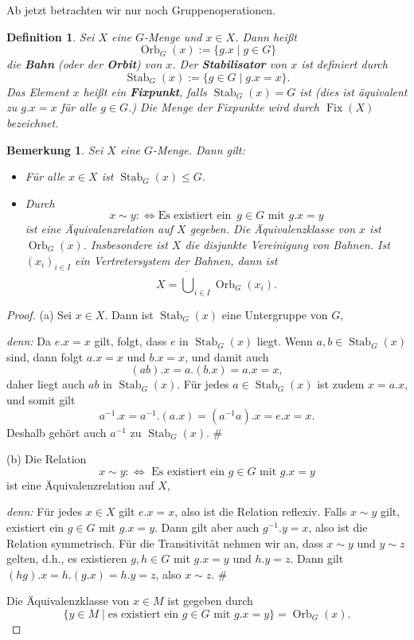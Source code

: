 \documentclass[a4paper, twoside, 11pt, ngerman]{report}
\DeclareMathOperator{\Fix}{Fix}
\DeclareMathOperator{\Orb}{Orb}
\DeclareMathOperator{\Stab}{Stab}
\theoremstyle{definistyle}
\newtheorem{defini}[satz]{Definition}
\newtheorem{bem}[satz]{Bemerkung}
\theoremstyle{remark}
\newenvironment{denn}%
  {\par\textit{denn:}}%
  {\hfill\#\par}
\newcommand{\defn}[1]{\textit{\bfseries #1}}
\begin{document}
Ab jetzt betrachten wir nur noch Gruppenoperationen.

\begin{defini}\label{def:orbit_stabilisator}
Sei $X$ eine $G$-Menge und $x \in X$. Dann heißt
\[
\Orb_G(x) := \{g . x \mid g \in G\}
\]
die \defn{Bahn} (oder der \defn{Orbit}) von $x$. Der \defn{Stabilisator} von $x$ ist definiert durch
\[
\Stab_G(x) := \{g \in G \mid g . x = x\}.
\]
Das Element $x$ heißt ein \defn{Fixpunkt}, falls $\Stab_G(x) = G$ ist (dies ist äquivalent zu  $g . x = x$ für alle $g \in G$.) Die Menge der Fixpunkte wird durch $\Fix(X)$ bezeichnet.
\end{defini}

\begin{bem}\label{bem:orbits_und_stabis}
Sei $X$ eine $G$-Menge. Dann gilt:
\begin{itemize}
    \item[(a)] Für alle $x \in X$ ist $\Stab_G(x) \leq G$.
    \item[(b)] Durch \[x \sim y :\Leftrightarrow \text{Es existiert ein } \, g \in G \text{ mit } g . x = y\] ist eine Äquivalenzrelation auf $X$ gegeben. Die Äquivalenzklasse von $x$ ist $\Orb_G(x)$. Insbesondere ist $X$ die disjunkte Vereinigung von Bahnen. Ist $(x_i )_{i\in I}$ ein Vertretersystem der Bahnen, dann ist 
    \[
     X = \dot\bigcup_{i\in I}\Orb_G(x_i).
    \]
\end{itemize}
\end{bem}


\begin{proof}
(a) Sei $x \in X$. Dann ist $\Stab_G(x)$ eine Untergruppe von $G$,
\begin{denn}
Da $e . x = x$ gilt, folgt, dass $e$ in $\Stab_G(x)$ liegt. Wenn $a, b \in \Stab_G(x)$ sind, dann folgt $a . x = x$ und $b . x = x$, und damit auch \[
(a b) . x = a . (b . x) = a . x = x,\] daher liegt auch $a b$ in $\Stab_G(x)$. Für jedes $a \in \Stab_G(x)$ ist zudem $x = a . x$, und somit gilt \[a^{-1} . x = a^{-1} . (a . x) = (a^{-1} a) . x = e . x = x.\] Deshalb gehört auch $a^{-1}$ zu $\Stab_G(x)$.
\end{denn}

(b) Die Relation \[x \sim y :\Leftrightarrow \text{ Es existiert ein } g \in G \text{ mit } g . x = y\] ist eine Äquivalenzrelation auf $X$,
\begin{denn}
Für jedes $x \in X$ gilt $e . x = x$, also ist die Relation reflexiv. Falls $x \sim y$ gilt, existiert ein $g \in G$ mit $g . x = y$. Dann gilt aber auch $g^{-1} . y = x$, also ist die Relation symmetrisch. Für die Transitivität nehmen wir an, dass $x \sim y$ und $y \sim z$ gelten, d.h., es existieren $g, h \in G$ mit $g . x = y$ und $h . y = z$. Dann gilt $(h g) . x = h . (g . x) = h . y = z$, also $x \sim z$.
\end{denn}
Die Äquivalenzklasse von $x \in M$ ist gegeben durch
\[
\{ y \in M \mid \text{es existiert ein } g \in G \text{ mit } g . x = y \} = \Orb_G(x).
\]
\end{proof}
\end{document}
